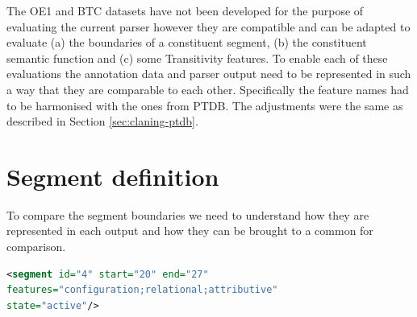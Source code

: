 \begin{table}[!ht]
    \centering
    \caption{Evaluation corpus summary}
    \label{tab:corpus-sumary}
\end{table}

The OE1 and BTC datasets have not been developed for the purpose of evaluating the current parser however they are compatible and can be adapted to evaluate (a) the boundaries of a constituent segment, (b) the constituent semantic function and (c) some Transitivity features. To enable each of these evaluations the annotation data and parser output need to be represented in such a way that they are comparable to each other. Specifically the feature names had to be harmonised with the ones from PTDB. The adjustments were the same as described in Section \ref{sec:claning-ptdb}.

\section{Segment definition}
To compare the segment boundaries we need to understand how they are represented in each output and how they can be brought to a common for comparison. 

\begin{lstlisting}[language=XML,frame=single,caption=Segment example in UAM corpus tool,label=lst:segment1]
<segment id="4" start="20" end="27" 
features="configuration;relational;attributive" 
state="active"/>
\end{lstlisting}


